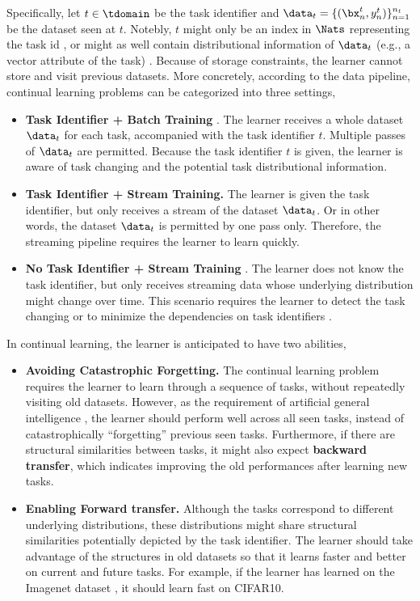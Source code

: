 Specifically, let $t \in \tdomain$ be the task identifier and $\data_{t} = \{(\bx_n^t, y_n^t)\}_{n=1}^{n_t}$ be the dataset seen at $t$. Notebly, $t$ might only be an index in $\Nats$ representing the task id \citep{kirkpatrick2017overcoming}, or might as well contain distributional information of $\data_t$ (e.g., a vector attribute of the task) \citep{chaudhry2018efficient}. Because of storage constraints, the learner cannot store and visit previous datasets. More concretely, according to the data pipeline, continual learning problems can be categorized into three settings, 
\begin{itemize}
\item \textbf{Task Identifier + Batch Training} \citep{lopez2017gradient, zenke2017continual}. The learner receives a whole dataset $\data_t$ for each task, accompanied with the task identifier $t$. Multiple passes of $\data_t$ are permitted. Because the task identifier $t$ is given, the learner is aware of task changing and the potential task distributional information.
\item \textbf{Task Identifier + Stream Training.} The learner is given the task identifier, but only receives a stream of the dataset $\data_t$. Or in other words, the dataset $\data_t$ is permitted by one pass only. Therefore, the streaming pipeline requires the learner to learn quickly.
\item \textbf{No Task Identifier + Stream Training} \citep{aljundi2018memory, buzzega2020dark}.  The learner does not know the task identifier, but only receives streaming data whose underlying distribution might change over time. This scenario requires the learner to detect the task changing \citep{titsias2019functional} or to minimize the dependencies on task identifiers \citep{chrysakis2020online}.
\end{itemize}
In continual learning, the learner is anticipated to have two abilities,
\begin{itemize}
\item \textbf{Avoiding Catastrophic Forgetting.} The continual learning problem requires the learner to learn through a sequence of tasks, without repeatedly visiting old datasets. However, as the requirement of artificial general intelligence \citep{legg2007universal}, the learner should perform well across all seen tasks, instead of catastrophically “forgetting” previous seen tasks. Furthermore, if there are structural similarities between tasks, it might also expect \textbf{backward transfer}, which indicates improving the old performances after learning new tasks.
\item \textbf{Enabling Forward transfer.} Although the tasks correspond to different underlying distributions, these distributions might share structural similarities potentially depicted by the task identifier. The learner should take advantage of the structures in old datasets so that it learns faster and better on current and future tasks. For example, if the learner has learned on the Imagenet dataset \citep{deng2009imagenet}, it should learn fast on CIFAR10.
\end{itemize}

